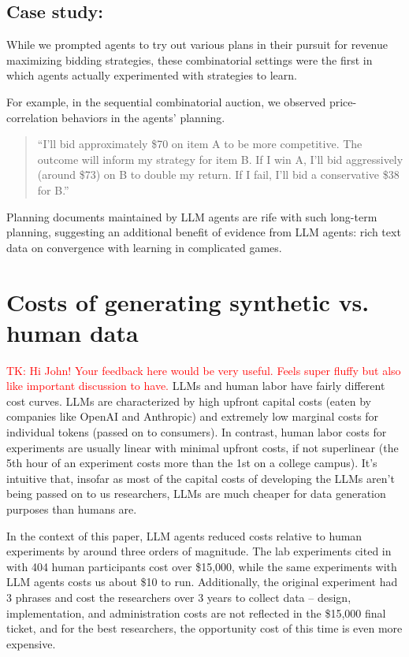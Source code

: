 \documentclass{article} %
\newcommand{\TK}[1]{\textcolor{red}{TK: #1}}
\begin{document}
\subsection{Case study:}
While we prompted agents to try out various plans in their pursuit for revenue maximizing bidding strategies, these combinatorial settings were the first in which agents actually experimented with strategies to learn. 

For example, in the sequential combinatorial auction, we observed price-correlation behaviors in the agents' planning.
\begin{quote}
    ``I'll bid approximately \$70 on item A to be more competitive. The outcome will inform my strategy for item B. If I win A, I'll bid aggressively (around \$73) on B to double my return. If I fail, I'll bid a conservative \$38 for B.''
\end{quote}

Planning documents maintained by LLM agents are rife with such long-term planning, suggesting an additional benefit of evidence from LLM agents: rich text data on convergence with learning in complicated games.


\section{Costs of generating synthetic vs. human data}
\TK{Hi John! Your feedback here would be very useful. 
Feels super fluffy but also like important discussion to have.}
LLMs and human labor have fairly different cost curves. 
LLMs are characterized by high upfront capital costs (eaten by companies like OpenAI and Anthropic) and extremely low marginal costs for individual tokens (passed on to consumers). 
In contrast, human labor costs for experiments are usually linear with minimal upfront costs, if not superlinear (the 5th hour of an experiment costs more than the 1st on a college campus). 
It's intuitive that, insofar as most of the capital costs of developing the LLMs aren't being passed on to us researchers, LLMs are much cheaper for data generation purposes than humans are.

In the context of this paper, LLM agents reduced costs relative to human experiments by around three orders of magnitude. 
The lab experiments cited in \cite{li2017obviously} with 404 human participants cost over \$15,000, while the same experiments with LLM agents costs us about \$10 to run. 
Additionally, the original experiment had 3 phrases and cost the researchers over 3 years to collect data -- design, implementation, and administration costs are not reflected in the \$15,000 final ticket, and for the best researchers, the opportunity cost of this time is even more expensive.
\end{document}
